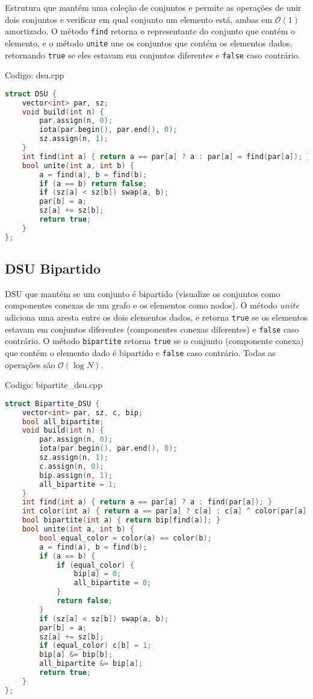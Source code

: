 \documentclass[10pt, a4paper, oneside]{book}
\begin{document}
Estrutura que mantém uma coleção de conjuntos e permite as operações de unir dois conjuntos e verificar em qual conjunto um elemento está, ambas em $\mathcal{O}(1)$ amortizado. O método \texttt{find} retorna o representante do conjunto que contém o elemento, e o método \texttt{unite} une os conjuntos que contém os elementos dados, retornando \texttt{true} se eles estavam em conjuntos diferentes e \texttt{false} caso contrário.

\hfill

Codigo: dsu.cpp

\begin{lstlisting}[language=C++]
struct DSU {
    vector<int> par, sz;
    void build(int n) {
        par.assign(n, 0);
        iota(par.begin(), par.end(), 0);
        sz.assign(n, 1);
    }
    int find(int a) { return a == par[a] ? a : par[a] = find(par[a]); }
    bool unite(int a, int b) {
        a = find(a), b = find(b);
        if (a == b) return false;
        if (sz[a] < sz[b]) swap(a, b);
        par[b] = a;
        sz[a] += sz[b];
        return true;
    }
};
\end{lstlisting}
\hfill

\subsection{DSU Bipartido}


DSU que mantém se um conjunto é bipartido (visualize os conjuntos como componentes conexas de um grafo e os elementos como nodos). O método $unite$ adiciona uma aresta entre os dois elementos dados, e retorna \texttt{true} se os elementos estavam em conjuntos diferentes (componentes conexas diferentes) e \texttt{false} caso contrário. O método \texttt{bipartite} retorna \texttt{true} se o conjunto (componente conexa) que contém o elemento dado é bipartido e \texttt{false} caso contrário. Todas as operações são $\mathcal{O}(\log N)$.

\hfill

Codigo: bipartite\_dsu.cpp

\begin{lstlisting}[language=C++]
struct Bipartite_DSU {
    vector<int> par, sz, c, bip;
    bool all_bipartite;
    void build(int n) {
        par.assign(n, 0);
        iota(par.begin(), par.end(), 0);
        sz.assign(n, 1);
        c.assign(n, 0);
        bip.assign(n, 1);
        all_bipartite = 1;
    }
    int find(int a) { return a == par[a] ? a : find(par[a]); }
    int color(int a) { return a == par[a] ? c[a] : c[a] ^ color(par[a]); }
    bool bipartite(int a) { return bip[find(a)]; }
    bool unite(int a, int b) {
        bool equal_color = color(a) == color(b);
        a = find(a), b = find(b);
        if (a == b) {
            if (equal_color) {
                bip[a] = 0;
                all_bipartite = 0;
            }
            return false;
        }
        if (sz[a] < sz[b]) swap(a, b);
        par[b] = a;
        sz[a] += sz[b];
        if (equal_color) c[b] = 1;
        bip[a] &= bip[b];
        all_bipartite &= bip[a];
        return true;
    }
};
\end{lstlisting}
\hfill
\end{document}
